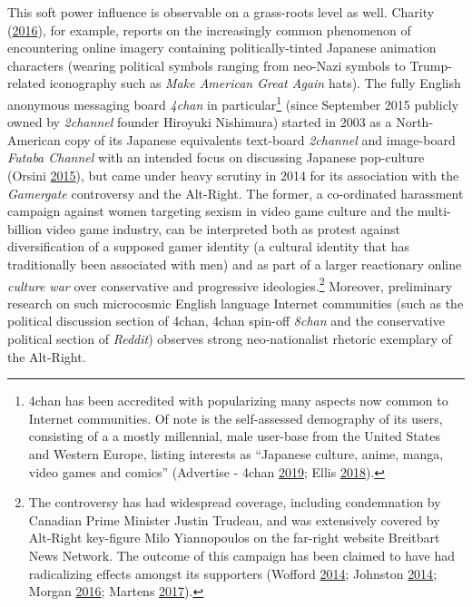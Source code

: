 \documentclass[10pt,british,A4paper,,openany]{memoir}
\begin{document}
This soft power influence is observable on a grass-roots level as well.
Charity (\protect\hyperlink{ref-charity_why_2016}{2016}), for example,
reports on the increasingly common phenomenon of encountering online
imagery containing politically-tinted Japanese animation characters
(wearing political symbols ranging from neo-Nazi symbols to
Trump-related iconography such as \emph{Make American Great Again}
hats). The fully English anonymous messaging board \emph{4chan} in
particular\footnote{4chan has been accredited with popularizing many
  aspects now common to Internet communities. Of note is the
  self-assessed demography of its users, consisting of a a mostly
  millennial, male user-base from the United States and Western Europe,
  listing interests as ``Japanese culture, anime, manga, video games and
  comics'' (Advertise - 4chan
  \protect\hyperlink{ref-noauthor_advertise_nodate}{2019}; Ellis
  \protect\hyperlink{ref-ellis_4chan_2018}{2018}).} (since September
2015 publicly owned by \emph{2channel} founder Hiroyuki Nishimura)
started in 2003 as a North-American copy of its Japanese equivalents
text-board \emph{2channel} and image-board \emph{Futaba Channel} with an
intended focus on discussing Japanese pop-culture (Orsini
\protect\hyperlink{ref-orsini_how_2015}{2015}), but came under heavy
scrutiny in 2014 for its association with the \emph{Gamergate}
controversy and the Alt-Right. The former, a co-ordinated harassment
campaign against women targeting sexism in video game culture and the
multi-billion video game industry, can be interpreted both as protest
against diversification of a supposed gamer identity (a cultural
identity that has traditionally been associated with men) and as part of
a larger reactionary online \emph{culture war} over conservative and
progressive ideologies.\footnote{The controversy has had widespread
  coverage, including condemnation by Canadian Prime Minister Justin
  Trudeau, and was extensively covered by Alt-Right key-figure Milo
  Yiannopoulos on the far-right website Breitbart News Network. The
  outcome of this campaign has been claimed to have had radicalizing
  effects amongst its supporters (Wofford
  \protect\hyperlink{ref-wofford_is_2014}{2014}; Johnston
  \protect\hyperlink{ref-johnston_chat_2014}{2014}; Morgan
  \protect\hyperlink{ref-morgan_analysis_2016}{2016}; Martens
  \protect\hyperlink{ref-martens_rally_2017}{2017}).} Moreover,
preliminary research on such microcosmic English language Internet
communities (such as the political discussion section of 4chan, 4chan
spin-off \emph{8chan} and the conservative political section of
\emph{Reddit}) observes strong neo-nationalist rhetoric exemplary of the
Alt-Right.
\end{document}

